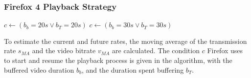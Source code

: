 \documentclass{beamer}
\begin{document}
\begin{frame}
	\frametitle{Firefox 4 Playback Strategy}

		\begin{algorithmic}
				\STATE $c \gets ( b_b=20s \lor b_T=20s )$
			\ELSE
				\STATE $c \gets ( b_b=30s \lor b_T=30s )$
			\ENDIF
		\end{algorithmic}

	To estimate the current and future rates, the moving average of the transmission rate $s_{MA}$ and the video bitrate $v_{MA}$ are calculated. The condition $c$ Firefox uses to start and resume the playback process is given in the algorithm, with the buffered video duration $b_b$, and the duration spent buffering $b_T$.
\end{frame}


\end{document}

